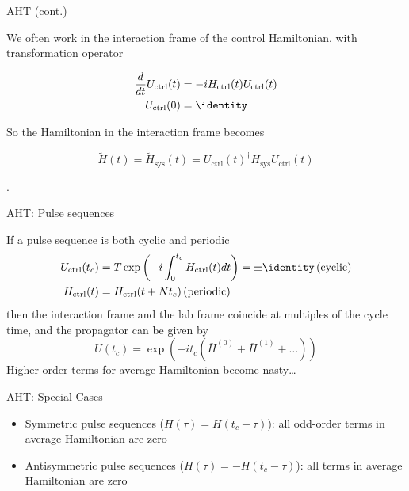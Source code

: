 \documentclass{beamer}
\begin{document}
\begin{frame}{AHT (cont.)}

We often work in the interaction frame of the control Hamiltonian, with transformation operator

\begin{align*}
    \frac{d}{dt} U_{\text{ctrl}}(t) &=
        -i H_{\text{ctrl}}(t)U_{\text{ctrl}}(t) \\
    U_{\text{ctrl}}(0) &= \identity
\end{align*}

So the Hamiltonian in the interaction frame becomes

\[
    \widetilde{H}(t) = \widetilde{H}_{\text{sys}}(t) = U_{\text{ctrl}}(t)^\dagger H_{\text{sys}} U_{\text{ctrl}}(t)
\]

\cite{brinkmann_2016}.
\end{frame}

\begin{frame}{AHT: Pulse sequences}


If a pulse sequence is both cyclic and periodic \cite{gerstein-dybowski}
\begin{align*}
    U_{\text{ctrl}}(t_c) &= T\exp \left(
        -i \int_0^{t_c} H_{\text{ctrl}}(t) dt \right) = \pm \identity
         \, \text{(cyclic)} \\
    H_{\text{ctrl}}(t) &= H_{\text{ctrl}}(t + Nt_c) \, \text{(periodic)}
\end{align*}
then the interaction frame and the lab frame coincide at multiples of
the cycle time, and the propagator can be given by
\[
    U(t_c) = \exp\left( -i t_c (\overline{H}^{(0)} +
        \overline{H}^{(1)} + \dots) \right)
\]
Higher-order terms for average Hamiltonian become nasty\dots

\end{frame}

\begin{frame}{AHT: Special Cases}

\begin{itemize}

\item
  Symmetric pulse sequences (\(H(\tau) = H(t_c - \tau)\)): all odd-order
  terms in average Hamiltonian are zero
\item
  Antisymmetric pulse sequences (\(H(\tau) = - H(t_c - \tau)\)): all
  terms in average Hamiltonian are zero
\end{itemize}
\end{frame}
\end{document}
